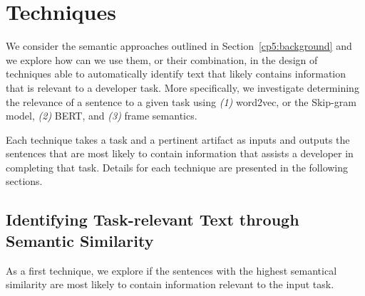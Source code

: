 \clearpage

\section{Techniques}
\label{cp5:approaches}





We consider the semantic approaches outlined in Section~\ref{cp5:background} and we explore 
how can we use them, or their combination, in the design of techniques able to automatically identify text that likely contains information that is relevant to a developer task. 
More specifically, we investigate determining the relevance of a sentence to a given task using 
\textit{(1)} word2vec, or the Skip-gram model, \textit{(2)} BERT, and \textit{(3)} frame semantics.

    




Each technique takes a task and a pertinent artifact as inputs and outputs the sentences 
that are most likely to contain information that assists a developer in completing that task.
Details for each technique are presented in the following sections.




\subsection{Identifying Task-relevant Text through Semantic Similarity}
\label{cp5:approach-w2v}


As a first technique, we explore if the sentences with the highest semantical similarity are most likely to contain information relevant to the input task. 



